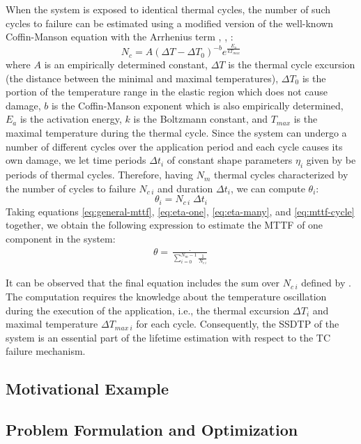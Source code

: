 When the system is exposed to identical thermal cycles, the number of such cycles to failure can be estimated using a modified version of the well-known Coffin-Manson equation with the Arrhenius term \cite{xiang2010}, \cite{jedec2010}, \cite{ciappa2003}:
\begin{equation} \label{eq:cycles-to-failure}
  N_c = A (\Delta T - \Delta T_0)^{-b} e^{\frac{E_a}{k T_{max}}}
\end{equation}
where $A$ is an empirically determined constant, $\Delta T$ is the thermal cycle excursion (the distance between the minimal and maximal temperatures), $\Delta T_0$ is the portion of the temperature range in the elastic region which does not cause damage, $b$ is the Coffin-Manson exponent which is also empirically determined, $E_{a}$ is the activation energy, $k$ is the Boltzmann constant, and $T_{max}$ is the maximal temperature during the thermal cycle. Since the system can undergo a number of different cycles over the application period and each cycle causes its own damage, we let time periods $\Delta t_i$ of constant shape parameters $\eta_i$ given by  be periods of thermal cycles. Therefore, having $N_m$ thermal cycles characterized by the number of cycles to failure $N_{c\:i}$ and duration $\Delta t_i$, we can compute $\theta_i$:
\begin{equation} \label{eq:mttf-cycle}
  \theta_i = N_{c \: i} \; \Delta t_i
\end{equation}
Taking equations \eqref{eq:general-mttf}, \eqref{eq:eta-one}, \eqref{eq:eta-many}, and \eqref{eq:mttf-cycle} together, we obtain the following expression to estimate the MTTF of one component in the system:
\begin{align} \label{eq:one-mttf}
  \theta = \frac{\period}{\sum_{i=0}^{N_m - 1} \frac{1}{N_{c \: i}}}
\end{align}

It can be observed that the final equation includes the sum over $N_{c \: i}$ defined by . The computation requires the knowledge about the temperature oscillation during the execution of the application, i.e., the thermal excursion $\Delta T_i$ and maximal temperature $\Delta T_{max \: i}$ for each cycle. Consequently, the SSDTP of the system is an essential part of the lifetime estimation with respect to the TC failure mechanism.

\subsection{Motivational Example} \label{sec:motivation}


\subsection{Problem Formulation and Optimization} \label{sec:reliability-problem}

